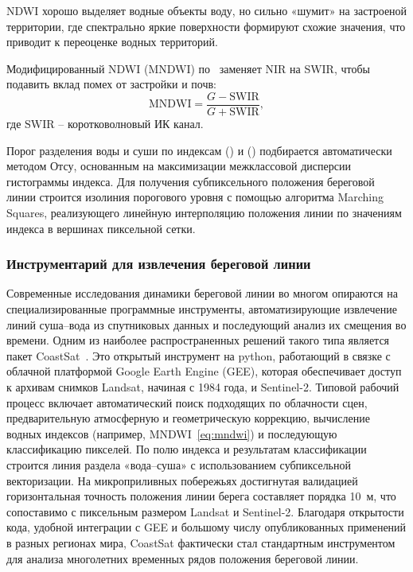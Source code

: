 NDWI хорошо выделяет водные объекты воду, но сильно «шумит» на застроеной территории, где спектрально яркие поверхности формируют схожие значения, что приводит к переоценке водных территорий.

Модифицированный NDWI (MNDWI) по~\cite{Xu2006MNDWI} заменяет NIR на SWIR, чтобы подавить вклад помех от застройки и почв:
\begin{equation}\label{eq:mndwi}
    \text{MNDWI} = \frac{G-\text{SWIR}}{G+\text{SWIR}},
\end{equation}
где $\text{SWIR}$ -- коротковолновый ИК канал.

Порог разделения воды и суши по индексам () и () подбирается автоматически методом Отсу, основанным на максимизации межклассовой дисперсии гистограммы индекса. 
Для получения субпиксельного положения береговой линии строится изолиния порогового уровня с помощью алгоритма Marching Squares, реализующего линейную интерполяцию положения линии по значениям индекса в вершинах пиксельной сетки.

\subsubsection{Инструментарий для извлечения береговой линии}
\label{sec:coastline_tools}

Современные исследования динамики береговой линии во многом опираются на специализированные программные инструменты, автоматизирующие извлечение линий суша–вода из спутниковых данных и последующий анализ их смещения во времени. 
Одним из наиболее распространенных решений такого типа является пакет CoastSat~\cite{Vos2019CoastSat}. 
Это открытый инструмент на python, работающий в связке с облачной платформой Google Earth Engine (GEE), которая обеспечивает доступ к архивам снимков Landsat, начиная с 1984 года, и Sentinel-2. 
Типовой рабочий процесс включает автоматический поиск подходящих по облачности сцен, предварительную атмосферную и геометрическую коррекцию, вычисление водных индексов (например, MNDWI~\eqref{eq:mndwi}) и последующую классификацию пикселей.
По полю индекса и результатам классификации строится линия раздела «вода–суша» с использованием субпиксельной векторизации. 
На микроприливных побережьях достигнутая валидацией горизонтальная точность положения линии берега составляет порядка 10~м, что сопоставимо с пиксельным размером Landsat и Sentinel-2. 
Благодаря открытости кода, удобной интеграции с GEE и большому числу опубликованных применений в разных регионах мира, CoastSat фактически стал стандартным инструментом для анализа многолетних временных рядов положения береговой линии.

